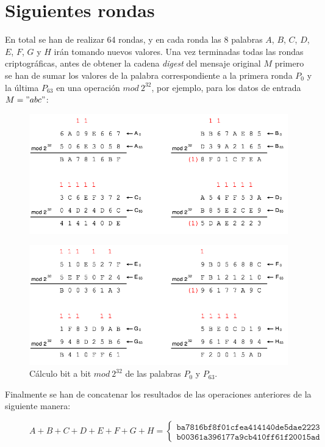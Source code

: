 \documentclass{article}
\begin{document}
\section{Siguientes rondas}
    En total se han de realizar 64 rondas, y en cada ronda las 8 palabras $A$, $B$, $C$, $D$, $E$, $F$, $G$ y $H$ irán tomando nuevos valores. Una vez terminadas todas las rondas criptográficas, antes de obtener la cadena \textit{digest} del mensaje original $M$ primero se han de sumar los valores de la palabra correspondiente a la primera ronda $P_{0}$ y la última $P_{63}$ en una operación $mod \ 2^{32}$, por ejemplo, para los datos de entrada $M = "abc"$:
        \begin{figure}[H]
        \centering
            \includegraphics[scale=0.41]{img/SHA-256-last_calculation_0.png}
        \end{figure}
        \begin{figure}[H]
        \centering
            \includegraphics[scale=0.41]{img/SHA-256-last_calculation_1.png}
            \caption{Cálculo bit a bit $mod \ 2^{32}$ de las palabras $P_{0}$ y $P_{63}$.}
        \end{figure}
    Finalmente se han de concatenar los resultados de las operaciones anteriores de la siguiente manera:
        \begin{figure}[H]
        \centering
            $A+B+C+D+E+F+G+H = \left \{
                \begin{array}{c}
                    \texttt{ba7816bf8f01cfea414140de5dae2223} \\
                    \texttt{b00361a396177a9cb410ff61f20015ad}
                \end{array}
                \right .$
        \end{figure}
\end{document}
